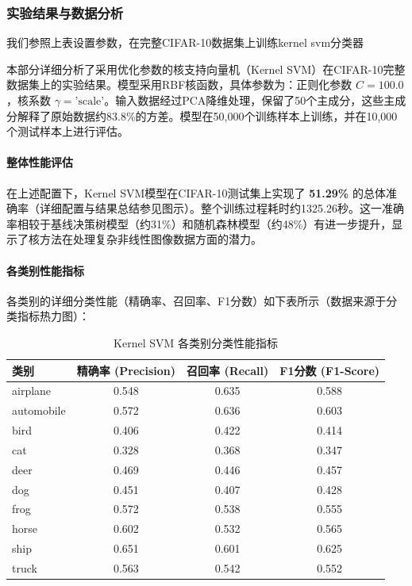 \documentclass[UTF8]{report}
\theoremstyle{MyLineTheoremStyle} %
\theoremstyle{MyBlockTheoremStyle} %
\theoremstyle{MySubsubsectionStyle} %
\begin{document}
\subsubsection{实验结果与数据分析}
我们参照上表设置参数，在完整CIFAR-10数据集上训练kernel svm分类器

本部分详细分析了采用优化参数的核支持向量机（Kernel SVM）在CIFAR-10完整数据集上的实验结果。模型采用RBF核函数，具体参数为：正则化参数 $C=100.0$，核系数 $\gamma = \text{'scale'}$。输入数据经过PCA降维处理，保留了50个主成分，这些主成分解释了原始数据约83.8\%的方差。模型在50,000个训练样本上训练，并在10,000个测试样本上进行评估。

\paragraph{整体性能评估}
在上述配置下，Kernel SVM模型在CIFAR-10测试集上实现了 \textbf{51.29\%} 的总体准确率（详细配置与结果总结参见图示）。整个训练过程耗时约1325.26秒。这一准确率相较于基线决策树模型（约31\%）和随机森林模型（约48\%）有进一步提升，显示了核方法在处理复杂非线性图像数据方面的潜力。

\paragraph{各类别性能指标}
各类别的详细分类性能（精确率、召回率、F1分数）如下表所示（数据来源于分类指标热力图）：

\begin{table}[H]
\centering
\caption{Kernel SVM 各类别分类性能指标}
\label{tab:svm_class_metrics_summary}
\begin{tabular}{l c c c}
\toprule
\textbf{类别} & \textbf{精确率 (Precision)} & \textbf{召回率 (Recall)} & \textbf{F1分数 (F1-Score)} \\
\midrule
airplane & 0.548 & 0.635 & 0.588 \\
automobile & 0.572 & 0.636 & 0.603 \\
bird & 0.406 & 0.422 & 0.414 \\
cat & 0.328 & 0.368 & 0.347 \\
deer & 0.469 & 0.446 & 0.457 \\
dog & 0.451 & 0.407 & 0.428 \\
frog & 0.572 & 0.538 & 0.555 \\
horse & 0.602 & 0.532 & 0.565 \\
ship & 0.651 & 0.601 & 0.625 \\
truck & 0.563 & 0.542 & 0.552 \\
\bottomrule
\end{tabular}
\end{table}
\end{document}
